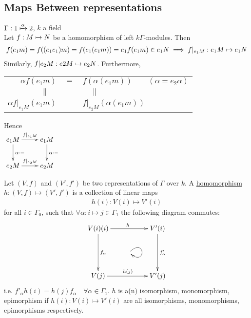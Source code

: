 \subsection{Maps Between representations}
\begin{exam}
\(\Gamma: 1\xmapsto{\alpha}2\), \(k\) a field\\
Let \(f:M\xmapsto{}N\) be a homomorphism of left \(k\Gamma\)-modules. Then
\begin{align*}
    f(e_1m) = f((e_1e_1)m) = f(e_1(e_1m)) = e_1f(e_1m) \in e_1N \implies f|_{e_1M}:e_1M \xmapsto{}e_1N
\end{align*}
Similarly, \(f|{e_2M}:e2M\xmapsto{}e_2N\). Furthermore, \\[0.5cm]
\begin{tabular}{rcl}
     \(\alpha f(e_1m)\) & \(=\) & \(f(\alpha(e_1m)) \quad\quad (\alpha = e_2\alpha)\) \\
     \(\parallel\quad\) & & \(\quad\parallel\) \\
     \(\alpha f|_{e_1M}(e_1m)\) & & \(f|_{e_2M}(\alpha(e_1m))\)
\end{tabular}
\end{exam}
\noindent Hence\\
\(\xymatrix{e_1M\ar[r]^{f|_{e_1M}}\ar[d]^{\alpha\cdot-} & e_1M\ar[d]^{\alpha\cdot\Large-} \\
e_2M\ar[r]^{f|_{e_2M}} & e_2M}\)
\begin{defin}
Let \((V, f)\) and \((V', f')\) be two representations of \(\Gamma\) over \(k\). A \underline{homomorphism} \(h:(V, f)\mapsto (V', f')\) is a collection of linear maps
\begin{align*}
    h(i): V(i) \mapsto V'(i)
\end{align*}
for all \(i\in\Gamma_0\), such that \(\forall\alpha :i\mapsto j\in\Gamma_1\) the following diagram commutes:
\begin{align*}
  \xymatrix{V(i)\ar[rr]^h(i)\ar[dd]^{f_\alpha} & & V'(i)\ar[dd]^{f'_\alpha} \\
 & \ar@(ur,dr) & \\
 V(j)\ar[rr]^{h(j)}& & V'(j)}  
\end{align*}
i.e. \(f'_\alpha h(i) = h(j)f_\alpha\quad\forall\alpha\in\Gamma_1\). \(h\) is a(n) isomorphism, monomorphism, epimorphism if \(h(i):V(i)\mapsto V'(i)\) are all isomorphisms, monomorphisms, epimorphisms respectively.
\end{defin}
